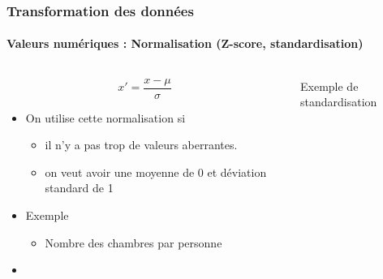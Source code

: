 \documentclass[xcolor=table]{beamer}
\begin{document}
\begin{frame}
	\frametitle{Transformation des données}
	\framesubtitle{Valeurs numériques : Normalisation (Z-score, standardisation)}
	
	\begin{columns}
	\begin{column}{.5\textwidth}
	\[x' = \frac{x - \mu}{\sigma}	\]
	
	\begin{itemize}
		\item On utilise cette normalisation si
		\begin{itemize}
			\item il n'y a pas trop de valeurs aberrantes.
			\item on veut avoir une moyenne de 0 et déviation standard de 1
		\end{itemize}
		\item Exemple
		\begin{itemize}
			\item Nombre des chambres par personne
		\end{itemize}
		\item {}
	\end{itemize}
	\end{column}
	\begin{column}{.5\textwidth}
		
		\begin{center}
			Exemple de standardisation \cite{2021-google-prep}
		\end{center}
	\end{column}
\end{columns}
	
\end{frame}
\end{document}
